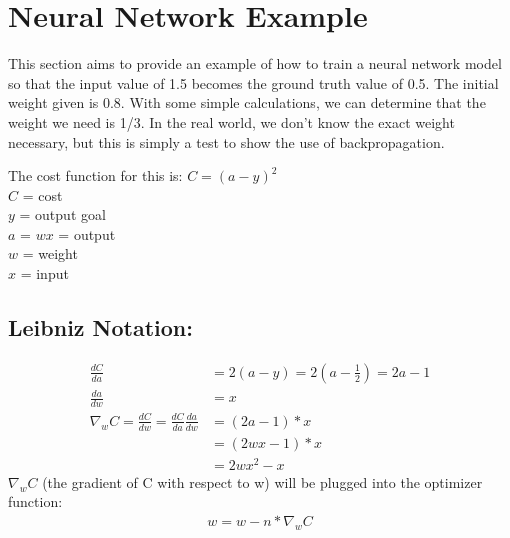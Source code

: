 \section{Neural Network Example}
This section aims to provide an example of how to train a neural network model so that the input value of 1.5 becomes the ground truth value of 0.5. The initial weight given is 0.8. With some simple calculations, we can determine that the weight we need is 1/3. In the real world, we don't know the exact weight necessary, but this is simply a test to show the use of backpropagation.
\begin{center}
\end{center}
The cost function for this is: $C = (a - y)^2$
\\ $C$ = cost
\\ $y$ = output goal
\\ $a$ = $wx$ = output
\\ $w$ = weight
\\ $x$ = input
\\
\subsection{Leibniz Notation:}
\begin{align}
\frac{dC}{da} &= 2(a-y) = 2(a-\frac{1}{2}) = 2a-1 \\
\frac{da}{dw} &= x \\
\nabla_{w}C = \frac{dC}{dw} = \frac{dC}{da} \frac{da}{dw} &= (2a-1) * x \\
&= (2wx-1)*x \\
&= 2wx^{2}-x
\end{align}
$\nabla_{w}C$ (the gradient of C with respect to w) will be plugged into the optimizer function: \\
\begin{align}
w=w-n*\nabla_{w}C
\end{align}



